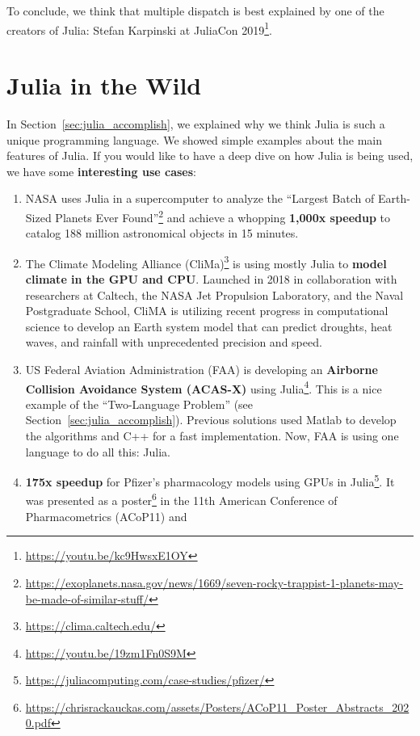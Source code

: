 \documentclass[
  notoc %
]{tufte-book}
\DeclareRobustCommand{\href}[2]{#2\footnote{\url{#1}}}
\providecommand{\tightlist}{%
  \setlength{\itemsep}{0pt}\setlength{\parskip}{0pt}
}
\begin{document}
To conclude, we think that multiple dispatch is best explained by one of
the creators of Julia: \href{https://youtu.be/kc9HwsxE1OY}{Stefan
Karpinski at JuliaCon 2019}.

\hypertarget{sec:julia_wild}{%
\section{Julia in the Wild}\label{sec:julia_wild}}

In Section~\ref{sec:julia_accomplish}, we explained why we think Julia
is such a unique programming language. We showed simple examples about
the main features of Julia. If you would like to have a deep dive on how
Julia is being used, we have some \textbf{interesting use cases}:

\begin{enumerate}
\def\labelenumi{\arabic{enumi}.}
\tightlist
\item
  NASA uses Julia in a supercomputer to analyze the
  \href{https://exoplanets.nasa.gov/news/1669/seven-rocky-trappist-1-planets-may-be-made-of-similar-stuff/}{``Largest
  Batch of Earth-Sized Planets Ever Found''} and achieve a whopping
  \textbf{1,000x speedup} to catalog 188 million astronomical objects in
  15 minutes.
\item
  \href{https://clima.caltech.edu/}{The Climate Modeling Alliance
  (CliMa)} is using mostly Julia to \textbf{model climate in the GPU and
  CPU}. Launched in 2018 in collaboration with researchers at Caltech,
  the NASA Jet Propulsion Laboratory, and the Naval Postgraduate School,
  CliMA is utilizing recent progress in computational science to develop
  an Earth system model that can predict droughts, heat waves, and
  rainfall with unprecedented precision and speed.
\item
  \href{https://youtu.be/19zm1Fn0S9M}{US Federal Aviation Administration
  (FAA) is developing an \textbf{Airborne Collision Avoidance System
  (ACAS-X)} using Julia}. This is a nice example of the ``Two-Language
  Problem'' (see Section~\ref{sec:julia_accomplish}). Previous solutions
  used Matlab to develop the algorithms and C++ for a fast
  implementation. Now, FAA is using one language to do all this: Julia.
\item
  \href{https://juliacomputing.com/case-studies/pfizer/}{\textbf{175x
  speedup} for Pfizer's pharmacology models using GPUs in Julia}. It was
  presented as a
  \href{https://chrisrackauckas.com/assets/Posters/ACoP11_Poster_Abstracts_2020.pdf}{poster}
  in the 11th American Conference of Pharmacometrics (ACoP11) and

\end{enumerate}
\end{document}
